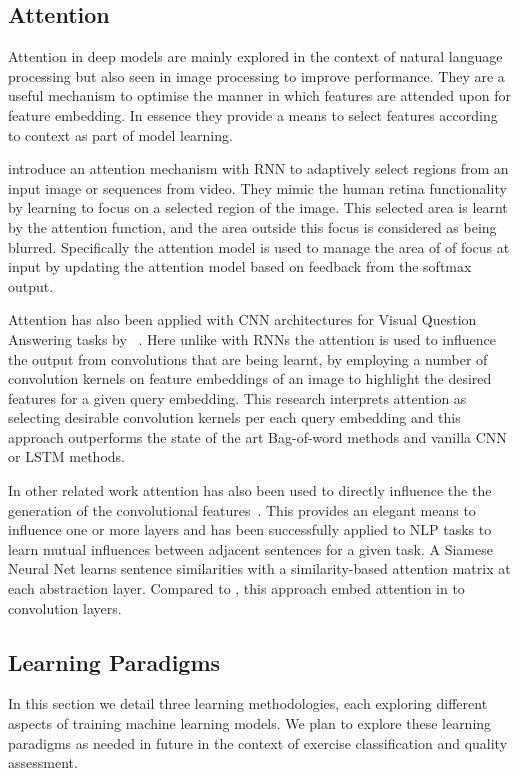\subsection{Attention}
Attention in deep models are mainly explored in the context of natural language processing but also seen in image processing to improve performance. 
They are a useful mechanism to optimise the manner in which features are attended upon for feature embedding.
In essence they provide a means to select features according to context as part of model learning.

 introduce an attention mechanism with RNN to adaptively select regions from an input image or sequences from video. They mimic the human retina functionality by learning to focus on a selected region of the image. This selected area is learnt by the attention function, and the area outside this focus is considered as being blurred. Specifically the attention model is used to manage the area of of focus at input by updating the attention model based on feedback from the softmax output. 

Attention has also been applied with CNN architectures for Visual Question Answering tasks by ~. Here unlike with RNNs the attention is used to influence the output from convolutions that are being learnt, by employing a number of convolution kernels on feature embeddings of an image to highlight the desired features for a given query embedding. This research interprets attention as selecting desirable convolution kernels per each query embedding and this approach outperforms the state of the art Bag-of-word methods and vanilla CNN or LSTM methods. 

In other related work attention has also been used to directly influence the the generation of the convolutional features~\cite{yin2015abcnn}. This provides an elegant means to influence one or more layers and has been successfully applied to NLP tasks to learn mutual influences between adjacent sentences for a given task. A Siamese Neural Net learns sentence similarities with a similarity-based attention matrix at each abstraction layer. Compared to , this approach embed attention in to convolution layers. 

\subsection{Learning Paradigms}
In this section we detail three learning methodologies, each exploring different aspects of training machine learning models. We plan to explore these learning paradigms as needed in future in the context of  exercise classification and quality assessment. 

